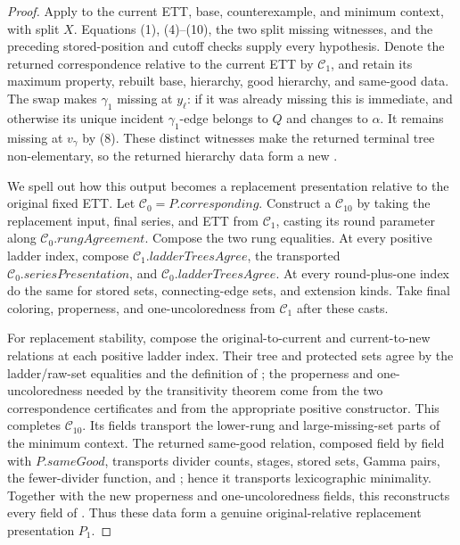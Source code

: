 \begin{proof}
Apply  to the current ETT,
base, counterexample, and minimum context, with split \(X\).  Equations
(1), (4)--(10), the two split missing witnesses, and the preceding
stored-position and cutoff checks supply every hypothesis.  Denote the
returned correspondence relative to the current ETT by \(\mathcal C_1\),
and retain its maximum property, rebuilt base, hierarchy, good hierarchy,
and same-good data.  The swap makes \(\gamma_1\) missing at \(y_\ell\):
if it was already missing this is immediate, and otherwise its unique
incident \(\gamma_1\)-edge belongs to \(Q\) and changes to \(\alpha\).
It remains missing at \(v_\gamma\) by (8).  These distinct witnesses make
the returned terminal tree non-elementary, so the returned hierarchy data
form a new .

We spell out how this output becomes a replacement presentation relative
to the original fixed ETT.  Let \(\mathcal C_0=P.\mathit{corresponding}\).
Construct a  \(\mathcal C_{10}\)
by taking the replacement input, final series, and ETT from
\(\mathcal C_1\), casting its round parameter along
\(\mathcal C_0.\mathit{rungAgreement}\).  Compose the two rung
equalities.  At every positive ladder index, compose
\(\mathcal C_1.\mathit{ladderTreesAgree}\), the transported
\(\mathcal C_0.\mathit{seriesPresentation}\), and
\(\mathcal C_0.\mathit{ladderTreesAgree}\).  At every round-plus-one
index do the same for stored sets, connecting-edge sets, and extension
kinds.  Take final coloring, properness, and one-uncoloredness from
\(\mathcal C_1\) after these casts.

For replacement stability, compose the original-to-current and
current-to-new  relations at each positive ladder
index.  Their tree and protected sets agree by the ladder/raw-set
equalities and the definition of ; the
properness and one-uncoloredness needed by the transitivity theorem
 come from the two correspondence certificates and from the
appropriate positive  constructor.  This
completes \(\mathcal C_{10}\).  Its fields transport the lower-rung and
large-missing-set parts of the minimum context.  The returned same-good
relation, composed field by field with \(P.\mathit{sameGood}\), transports
divider counts, stages, stored sets, Gamma pairs, the fewer-divider
function, and ; hence it transports
lexicographic minimality.  Together with the new properness and
one-uncoloredness fields, this reconstructs every field of
.  Thus these data form a
genuine original-relative replacement presentation \(P_1\).


\end{proof}
